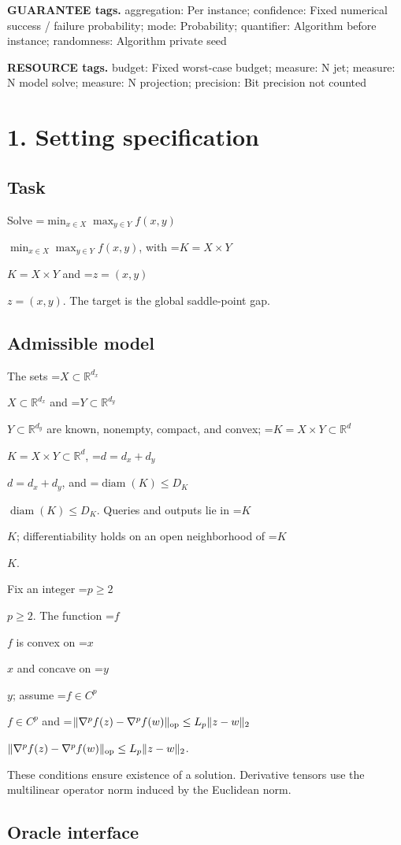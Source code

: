 \documentclass[10pt,a4paper]{article}
\newcommand{\AtlasMath}[1]{\par\begingroup\centering\setbox0=\hbox{$\displaystyle #1$}\ifdim\wd0>1.4\linewidth\typeout{ATLAS WIDE FORMULA: \the\wd0}\fi\ifdim\wd0>\linewidth\resizebox{\linewidth}{!}{\box0}\else\box0\fi\par\endgroup}
\newcommand{\AtlasInlineMath}[1]{\begingroup\setbox0=\hbox{$#1$}\ifdim\wd0>.4\linewidth\endgroup\AtlasMath{#1}\else\endgroup$#1$\fi}
\begin{document}
\textbf{GUARANTEE tags.} aggregation: Per instance; confidence: Fixed numerical success / failure probability; mode: Probability; quantifier: Algorithm before instance; randomness: Algorithm private seed



\textbf{RESOURCE tags.} budget: Fixed worst-case budget; measure: N jet; measure: N model solve; measure: N projection; precision: Bit precision not counted



\section{1. Setting specification}


\subsection{Task}


Solve \AtlasInlineMath{\min_{x\in X}\max_{y\in Y}f(x,y)}, with \AtlasInlineMath{K=X\times Y} and \AtlasInlineMath{z=(x,y)}. The target is the global saddle-point gap.



\subsection{Admissible model}


The sets \AtlasInlineMath{X\subset\mathbb R^{d_x}} and \AtlasInlineMath{Y\subset\mathbb R^{d_y}} are known, nonempty, compact, and convex; \AtlasInlineMath{K=X\times Y\subset\mathbb R^d}, \AtlasInlineMath{d=d_x+d_y}, and \AtlasInlineMath{\operatorname{diam}(K)\le D_K}. Queries and outputs lie in \AtlasInlineMath{K}; differentiability holds on an open neighborhood of \AtlasInlineMath{K}.



Fix an integer \AtlasInlineMath{p\ge2}. The function \AtlasInlineMath{f} is convex on \AtlasInlineMath{x} and concave on \AtlasInlineMath{y}; assume \AtlasInlineMath{f\in C^p} and \AtlasInlineMath{\|\nabla^p f(z)-\nabla^p f(w)\|_{\rm op}\le L_p\|z-w\|_2}.



These conditions ensure existence of a solution. Derivative tensors use the multilinear operator norm induced by the Euclidean norm.



\subsection{Oracle interface}
\end{document}
